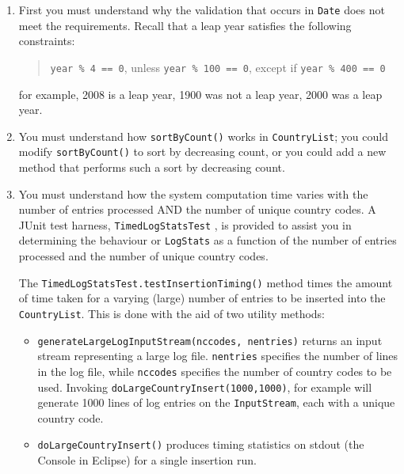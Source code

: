 \documentclass[12pt,a4paper]{article}
\begin{document}
\begin{enumerate}
\item First you must understand why the validation that occurs in
  \lstinline!Date! does not meet the requirements. Recall that a leap
  year satisfies the following constraints:

\begin{quotation}
\lstinline!year % 4 == 0!, unless \lstinline!year % 100 == 0!, except if \lstinline!year % 400 == 0!
\end{quotation}
 
for example, 2008 is a leap year, 1900 was not a leap year, 2000 was a
leap year.

\item You must understand how \lstinline!sortByCount()! works in
  \lstinline!CountryList!; you could modify \lstinline!sortByCount()!
  to sort by decreasing count, or you could add a new method that
  performs such a sort by decreasing count.

\item You must understand how the system computation time varies with
  the number of entries processed AND the number of unique country
  codes.  A JUnit test harness, \lstinline!TimedLogStatsTest! , is
  provided to assist you in determining the behaviour or
  \lstinline!LogStats! as a function of the number of entries
  processed and the number of unique country codes.

  The \lstinline!TimedLogStatsTest.testInsertionTiming()!
  method times the amount of time taken for a varying (large) number
  of entries to be inserted into the \lstinline!CountryList!.  This is
  done with the aid of two utility methods:

  \begin{itemize}
  \item \lstinline!generateLargeLogInputStream(nccodes, nentries)!
    returns an input stream representing a large log file.
    \lstinline!nentries! specifies the number of lines in the log
    file, while \lstinline!nccodes! specifies the number of country
    codes to be used.  Invoking
    \lstinline!doLargeCountryInsert(1000,1000)!, for example will
    generate 1000 lines of log entries on the \lstinline!InputStream!,
    each with a unique country code.
  \item \lstinline!doLargeCountryInsert()! produces timing statistics
    on stdout (the Console in Eclipse) for a single insertion run.
  \end{itemize}


\end{enumerate}
\end{document}
